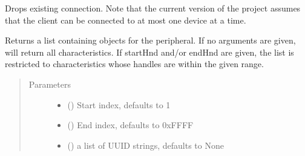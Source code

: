 \documentclass[letterpaper,10pt,english]{sphinxmanual}
\begin{document}
\begin{fulllineitems}
\begin{fulllineitems}
\begin{quote}
\begin{description}
\end{description}\end{quote}

\end{fulllineitems}


\begin{fulllineitems}
\label{\detokenize{PandaBot:PandaBot.PandaBotClient.disconnect}}
Drops existing connection. 
Note that the current version of the project assumes that the client can be connected to at most one device at a time.

\end{fulllineitems}


\begin{fulllineitems}
\label{\detokenize{PandaBot:PandaBot.PandaBotClient.getCharacteristics}}
Returns a list containing  objects for the peripheral. If no arguments are given, will return all characteristics. If startHnd and/or endHnd are given, the list is restricted to characteristics whose handles are within the given range.
\begin{quote}\begin{description}
\item[{Parameters}] \leavevmode\begin{itemize}
\item {} 
 (\sphinxstyleliteralemphasis{\sphinxupquote{, }}) \textendash{} Start index, defaults to 1

\item {} 
 (\sphinxstyleliteralemphasis{\sphinxupquote{, }}) \textendash{} End index, defaults to 0xFFFF

\item {} 
 (\sphinxstyleliteralemphasis{\sphinxupquote{, }}) \textendash{} a list of UUID strings, defaults to None


\end{itemize}
\end{description}
\end{quote}
\end{fulllineitems}
\end{fulllineitems}
\end{document}
